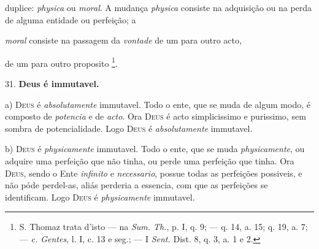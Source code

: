  duplice: \emph{physica} ou \emph{moral}. A mudança \emph{physica} consiste na adquisição ou na perda de alguma entidade ou perfeição; a

 \emph{moral} consiste na passagem da \emph{vontade} de um para outro acto,

de um para outro proposito \footnote{S. Thomaz trata d'isto --- na \emph{Sum. Th.}, p. I, q. 9; --- q. 14, a. 15; q. 19, a. 7; --- \emph{c. Gentes}, l. I, c. 13 e seg.; --- I \emph{Sent.} Dist. 8, q. 3, a. 1 e 2.}.

31. \textbf{Deus é immutavel.}

a) \textsc{Deus} é \emph{absolutamente} immutavel. Todo o ente, que se muda de algum modo, é composto de \emph{potencia} e de \emph{acto}. Ora \textsc{Deus} é acto simplicissimo e purissimo, sem sombra de potencialidade. Logo \textsc{Deus} é \emph{absolutamente} immutavel.

b) \textsc{Deus} é \emph{physicamente} immutavel. Todo o ente, que se muda \emph{physicamente}, ou adquire uma perfeição que não tinha, ou perde uma perfeição que tinha. Ora \textsc{Deus}, sendo o Ente \emph{infinito} e \emph{necessario}, possue todas as perfeições possiveis, e não póde perdel-as, aliás perderia a essencia, com que as perfeições se identificam. Logo \textsc{Deus} é \emph{physicamente} immutavel.

